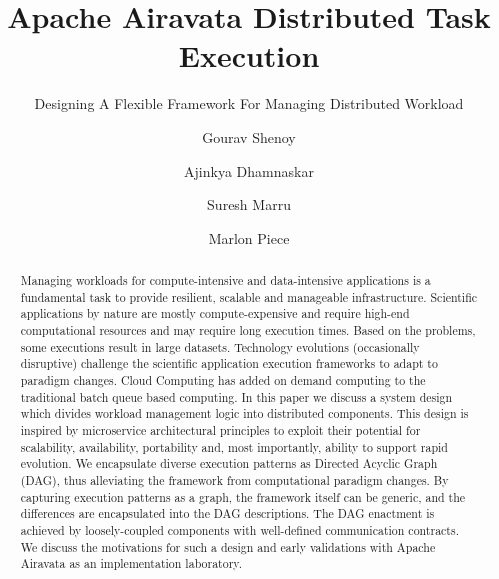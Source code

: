 \documentclass[sigconf]{acmart}
\begin{document}
\title{Apache Airavata Distributed Task Execution}
\subtitle{Designing A Flexible Framework For Managing Distributed Workload}

\author{Gourav Shenoy}

\author{Ajinkya Dhamnaskar}

\author{Suresh Marru}

\author{Marlon Piece}

\begin{abstract}
Managing workloads for compute-intensive and data-intensive applications is a fundamental task to provide resilient, scalable and manageable infrastructure. Scientific applications by nature are mostly compute-expensive and require high-end computational resources and may require long execution times. Based on the problems, some executions result in large datasets. Technology evolutions (occasionally disruptive) challenge the scientific application execution frameworks to adapt to paradigm changes. Cloud Computing has added on demand computing to the traditional batch queue based computing. In this paper we discuss a system design which divides workload management logic into distributed components. This design is inspired by microservice architectural principles to exploit their potential for scalability, availability, portability and, most importantly, ability to support rapid evolution. We encapsulate diverse execution patterns as Directed Acyclic Graph (DAG), thus alleviating the framework from computational paradigm changes. By capturing execution patterns as a graph, the framework itself can be generic, and the differences are encapsulated into the DAG descriptions. The DAG enactment is achieved by loosely-coupled components with well-defined communication contracts. We discuss the motivations for such a design and early validations with Apache Airavata as an implementation laboratory.   
\end{abstract}
\end{document}
